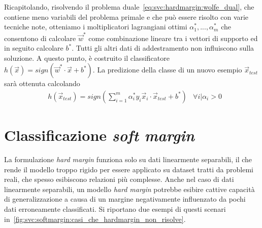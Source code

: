 Ricapitolando, risolvendo il problema duale~\cref{eq:svc:hardmargin:wolfe_dual}, che contiene meno variabili del problema primale e che può essere risolto con varie tecniche note, otteniamo i moltiplicatori lagrangiani ottimi $\alpha_1^*, ..., \alpha_m^*$ che consentono di calcolare $\Vec{w}^*$ come combinazione lineare tra i vettori di supporto ed in seguito calcolare $b^*$. 
Tutti gli altri dati di addestramento non influiscono sulla soluzione. 
A questo punto, è costruito il classificatore $h(\Vec{x}) = sign(\Vec{w}^*\cdot \Vec{x} +b^*)$.
La predizione della classe di un nuovo esempio $\Vec{x}_{test}$ sarà ottenuta calcolando 
\begin{equation*}
\begin{aligned}
& h(\Vec{x}_{test}) = sign\left(\sum_{i=1}^{m}\alpha_i^*y_i\Vec{x}_i \cdot \Vec{x}_{test} + b^*\right) & \forall i | \alpha_i > 0
\end{aligned}
\end{equation*}



\section{Classificazione \emph{soft margin}}\label{sec:soft_margin_classifier}
La formulazione \emph{hard margin} funziona solo su dati linearmente separabili, il che rende il modello troppo rigido per essere applicato su dataset tratti da problemi reali, che spesso esibiscono relazioni più complesse. 
Anche nel caso di dati linearmente separabili, un modello \emph{hard margin} potrebbe esibire cattive capacità di generalizzazione a causa di un margine negativamente influenzato da pochi dati erroneamente classificati.
Si riportano due esempi di questi scenari in~\cref{fig:svc:softmargin:casi_che_hardmargin_non_risolve}.

